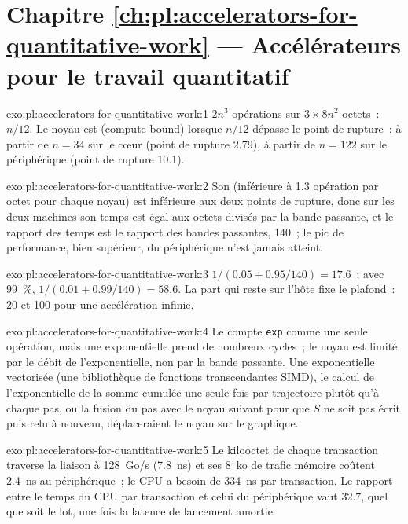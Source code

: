 \section*{Chapitre \ref{ch:pl:accelerators-for-quantitative-work} --- Accélérateurs pour le travail quantitatif}

\begin{solution}{exo:pl:accelerators-for-quantitative-work:1}
$2n^3$ opérations sur $3 \times 8n^2$ octets~: $n/12$. Le noyau est  (compute-bound) lorsque $n/12$ dépasse le point de rupture~: à partir de $n = 34$ sur le cœur (point de rupture 2.79),
à partir de $n = 122$ sur le périphérique (point de rupture 10.1).
\end{solution}

\begin{solution}{exo:pl:accelerators-for-quantitative-work:2}
Son  (inférieure à 1.3 opération par octet pour chaque noyau) est inférieure aux deux points de rupture, donc sur les deux machines son temps est égal aux octets divisés par la bande passante,
et le rapport des temps est le rapport des bandes passantes, 140~; le pic de performance, bien supérieur, du périphérique n'est jamais atteint.
\end{solution}

\begin{solution}{exo:pl:accelerators-for-quantitative-work:3}
$1/(0.05 + 0.95/140) = 17.6$~; avec 99~\%, $1/(0.01 + 0.99/140) = 58.6$. La part qui reste sur l'hôte fixe le plafond~: 20 et 100 pour
une accélération infinie.
\end{solution}

\begin{solution}{exo:pl:accelerators-for-quantitative-work:4}
Le  compte \texttt{exp} comme une seule opération, mais une exponentielle prend de nombreux cycles~; le noyau est limité par le débit de
l'exponentielle, non par la bande passante. Une exponentielle vectorisée (une bibliothèque de fonctions transcendantes SIMD), le calcul de l'exponentielle de la
somme cumulée une seule fois par trajectoire plutôt qu'à chaque pas, ou la fusion du pas avec le noyau suivant pour que $S$ ne soit
pas écrit puis relu à nouveau, déplaceraient le noyau sur le graphique.
\end{solution}

\begin{solution}{exo:pl:accelerators-for-quantitative-work:5}
Le kilooctet de chaque transaction traverse la liaison à 128~Go/s (7.8~ns) et ses 8~ko de trafic mémoire coûtent 2.4~ns au périphérique~; le CPU a besoin de 334~ns par
transaction. Le rapport entre le temps du CPU par transaction et celui du périphérique vaut 32.7, quel que soit le lot, une fois la latence de lancement amortie.
\end{solution}


